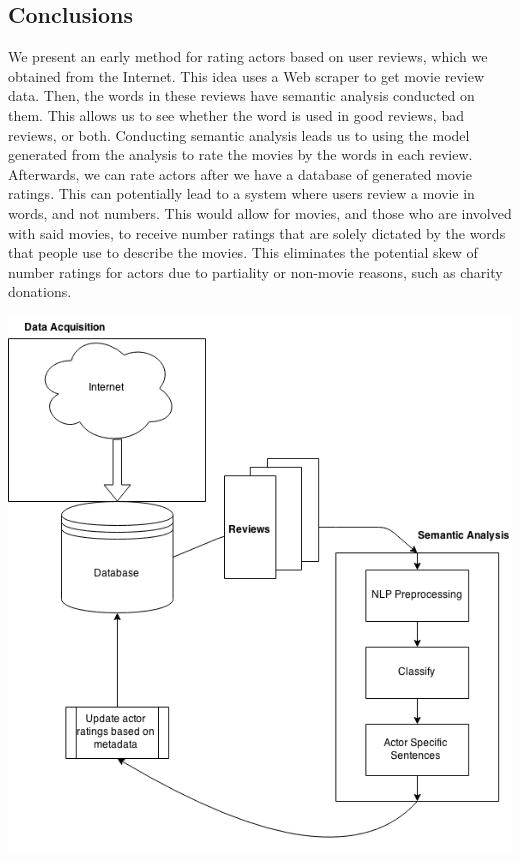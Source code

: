 \documentclass[a0,portrait]{a0poster}
\begin{document}
\begin{multicols}{2}
\section*{Conclusions}

We present an early method for rating actors based on user reviews, which we obtained from the Internet. This idea uses a Web scraper to get movie review data.  Then, the words in these reviews have semantic analysis conducted on them.  This allows us to see whether the word is used in good reviews, bad reviews, or both.  Conducting semantic analysis leads us to using the model generated from the analysis to rate the movies by the words in each review.  Afterwards, we can rate actors after we have a database of generated movie ratings.  This can potentially lead to a system where users review a movie in words, and not numbers.  This would allow for movies, and those who are involved with said movies, to receive number ratings that are solely dictated by the words that people use to describe the movies.  This eliminates the potential skew of number ratings for actors due to partiality or non-movie reasons, such as charity donations.


\begin{center}\vspace{1cm}
\includegraphics[width=0.8\linewidth]{flow2}
\end{center}\vspace{1cm}



\end{multicols}
\end{document}
